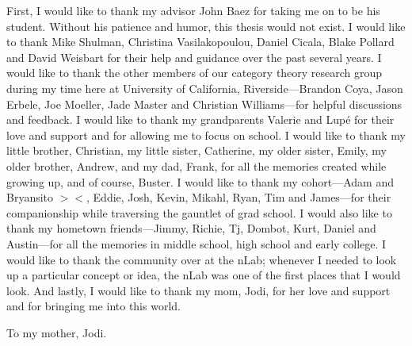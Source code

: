 \documentclass[oneside,final]{ucr}
\theoremstyle{definition}
\begin{document}
\begin{frontmatter}

{\ssp
\begin{acknowledgements}
First, I would like to thank my advisor John Baez for taking me on to be his student. Without his patience and humor, this thesis would not exist. I would like to thank Mike Shulman, Christina Vasilakopoulou, Daniel Cicala, Blake Pollard and David Weisbart for their help and guidance over the past several years. I would like to thank the other members of our category theory research group during my time here at University of California, Riverside---Brandon Coya, Jason Erbele, Joe Moeller, Jade Master and Christian Williams---for helpful discussions and feedback. I would like to thank my grandparents Valerie and Lup\'e for their love and support and for allowing me to focus on school. I would like to thank my little brother, Christian, my little sister, Catherine, my older sister, Emily, my older brother, Andrew, and my dad, Frank, for all the memories created while growing up, and of course, Buster. I would like to thank my cohort---Adam and Bryansito $><$, Eddie, Josh, Kevin, Mikahl, Ryan, Tim and James---for their companionship while traversing the gauntlet of grad school. I would also like to thank my hometown friends---Jimmy, Richie, Tj, Dombot, Kurt, Daniel and Austin---for all the memories in middle school, high school and early college. I would like to thank the community over at the nLab; whenever I needed to look up a particular concept or idea, the nLab was one of the first places that I would look. And lastly, I would like to thank my mom, Jodi, for her love and support and for bringing me into this world.
\end{acknowledgements}
 }
\begin{dedication}

\vspace*{\fill}

\begin{center}
To my mother, Jodi.
\end{center}

\vspace*{\fill}

\end{dedication}


\end{frontmatter}
\end{document}
